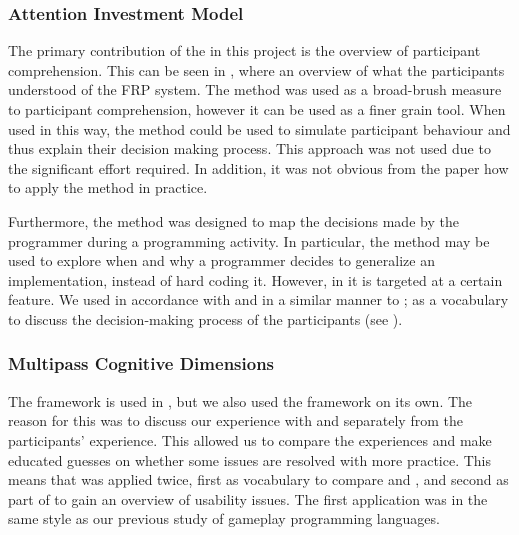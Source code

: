 \subsubsection{Attention Investment Model}
The primary contribution of the \attention in this project is the overview of participant comprehension. This can be seen in , where an overview of what the participants understood of the \gls{FRP} system. The method was used as a broad-brush measure to participant comprehension, however it can be used as a finer grain tool. When used in this way, the method could be used to simulate participant behaviour and thus explain their decision making process\cite{blackwell2002first}. This approach was not used due to the significant effort required. In addition, it was not obvious from the paper how to apply the method in practice.

Furthermore, the \attention method was designed to map the decisions made by the programmer during a programming activity. In particular, the method may be used to explore when and why a programmer decides to generalize an implementation, instead of hard coding it. However, in \champagne it is targeted at a certain feature. We used \attention in accordance with \champagne and in a similar manner to \cognitive; as a vocabulary to discuss the decision-making process of the participants (see ).

\subsubsection{Multipass Cognitive Dimensions}
The \cognitive framework is used in \champagne, but we also used the framework on its own. The reason for this was to discuss our experience with \fs and \cs separately from the participants' experience. This allowed us to compare the experiences and make educated guesses on whether some issues are resolved with more practice. This means that \cognitive was applied twice, first as vocabulary to compare \cs and \fs, and second as part of \champagne to gain an overview of usability issues. The first application was in the same style as our previous study of gameplay programming languages\cite{p92018gameplay}.

